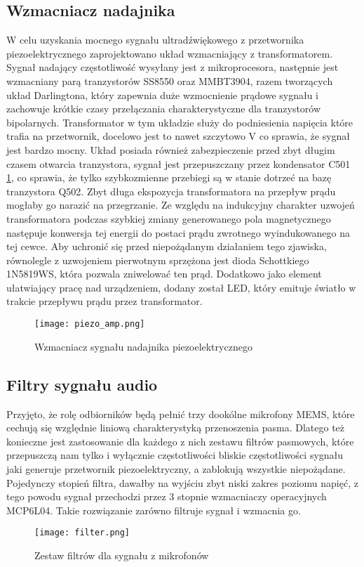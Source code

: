 \subsection{Wzmacniacz nadajnika}
W celu uzyskania mocnego sygnału ultradźwiękowego z przetwornika piezoelektrycznego zaprojektowano układ wzmacniający z transformatorem. 
Sygnał nadający częstotliwość wysyłany jest z mikroprocesora, następnie jest wzmacniany parą tranzystorów SS8550 oraz MMBT3904, razem tworzących układ Darlingtona, 
który zapewnia duże wzmocnienie prądowe sygnału i zachowuje krótkie czasy przełączania charakterystyczne dla tranzystorów bipolarnych.
Transformator w tym układzie służy do podniesienia napięcia które trafia na przetwornik, docelowo jest to nawet szczytowo \unit[80]{V} co sprawia, 
że sygnał jest bardzo mocny.
Układ posiada również zabezpieczenie przed zbyt długim czasem otwarcia tranzystora, sygnał jest przepuszczany przez kondensator C501 \ref{fig:piezo_amp}, 
co sprawia, że tylko szybkozmienne przebiegi są w stanie dotrzeć na bazę tranzystora Q502.
Zbyt długa ekspozycja transformatora na przepływ prądu mogłaby go narazić na przegrzanie.
Ze względu na indukcyjny charakter uzwojeń transformatora podczas szybkiej zmiany generowanego pola magnetycznego następuje 
konwersja tej energii do postaci prądu zwrotnego wyindukowanego na tej cewce. Aby uchronić się przed niepożądanym działaniem tego zjawiska, 
równolegle z uzwojeniem pierwotnym sprzężona jest dioda Schottkiego 1N5819WS, która pozwala zniwelować ten prąd.
Dodatkowo jako element ułatwiający pracę nad urządzeniem, dodany został LED, który emituje światło w trakcie przepływu prądu przez transformator.
\begin{figure}[ht!]
    \centering
    \texttt{[image: piezo\_amp.png]}
    \caption{Wzmacniacz sygnału nadajnika piezoelektrycznego}
    \label{fig:piezo_amp}
\end{figure}

\subsection{Filtry sygnału audio}

Przyjęto, że rolę odbiorników będą pełnić trzy dookólne mikrofony MEMS, które cechują się względnie liniową charakterystyką przenoszenia pasma. 
Dlatego też konieczne jest zastosowanie dla każdego z nich zestawu filtrów pasmowych, które przepuszczą nam tylko i wyłącznie częstotliwości bliskie częstotliwości 
sygnału jaki generuje przetwornik piezoelektryczny, a zablokują wszystkie niepożądane. 
Pojedynczy stopień filtra, dawałby na wyjściu zbyt niski zakres poziomu napięć, 
z tego powodu sygnał przechodzi przez 3 stopnie wzmacniaczy operacyjnych MCP6L04. Takie rozwiązanie zarówno filtruje sygnał i wzmacnia go.
\begin{figure}[ht!]
    \centering
    \texttt{[image: filter.png]}
    \caption{Zestaw filtrów dla sygnału z mikrofonów}
    \label{fig:filter}
\end{figure}


